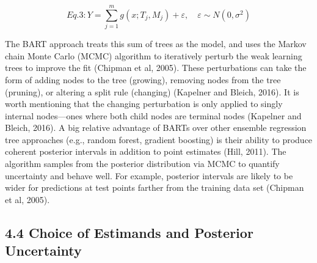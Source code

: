 \documentclass[
  12pt,
]{article}
\begin{document}
\[Eq. 3: Y = \sum_{j=1}^{m} g(x; T_j, M_j) + \varepsilon, \quad \varepsilon \sim N(0, \sigma^2)\]

The BART approach treats this sum of trees as the model, and uses the
Markov chain Monte Carlo (MCMC) algorithm to iteratively perturb the
weak learning trees to improve the fit (Chipman et al, 2005). These
perturbations can take the form of adding nodes to the tree (growing),
removing nodes from the tree (pruning), or altering a split rule
(changing) (Kapelner and Bleich, 2016). It is worth mentioning that the
changing perturbation is only applied to singly internal nodes---ones
where both child nodes are terminal nodes (Kapelner and Bleich, 2016). A
big relative advantage of BARTs over other ensemble regression tree
approaches (e.g., random forest, gradient boosting) is their ability to
produce coherent posterior intervals in addition to point estimates
(Hill, 2011). The algorithm samples from the posterior distribution via
MCMC to quantify uncertainty and behave well. For example, posterior
intervals are likely to be wider for predictions at test points farther
from the training data set (Chipman et al, 2005).

\subsection{4.4 Choice of Estimands and Posterior
Uncertainty}\label{choice-of-estimands-and-posterior-uncertainty}
\end{document}

